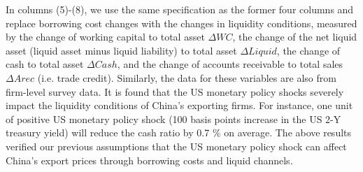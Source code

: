 In columns (5)-(8), we use the same specification as the former four columns and replace borrowing cost changes with the changes in liquidity conditions, measured by the change of working capital to total asset $\Delta WC$, the change of the net liquid asset (liquid asset minus liquid liability) to total asset $\Delta Liquid$, the change of cash to total asset $\Delta Cash$, and the change of accounts receivable to total sales $\Delta Arec$ (i.e. trade credit). Similarly, the data for these variables are also from firm-level survey data. It is found that the US monetary policy shocks severely impact the liquidity conditions of China's exporting firms. For instance, one unit of positive US monetary policy shock (100 basis points increase in the US 2-Y treasury yield) will reduce the cash ratio by 0.7 $\%$ on average. The above results verified our previous assumptions that the US monetary policy shock can affect China's export prices through borrowing costs and liquid channels.

